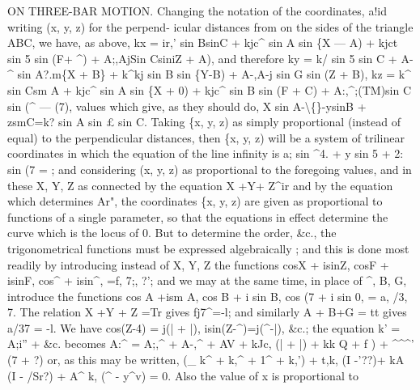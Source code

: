 \documentclass[12pt,a4paper]{article}
\begin{document}
ON THREE-BAR MOTION.
Changing
the
notation
of
the
coordinates,
a!id
writing
(x,
y,
z)
for
the
perpend-
icular distances from
on
the
sides of the
triangle ABC, we have,
as above,
kx = ir,' sin BsinC + kjc\textasciicircum{} sin A sin \{X --- A) + kjct sin 5 sin (F+ \textasciicircum{}) + A;,AjSin CsiniZ + A),
and therefore
ky = k/ sin 5 sin C + A-\textasciicircum{} sin A?.m\{X + B\} + k\textasciicircum{}kj sin B sin \{Y-B) + A-,A-j sin G sin (Z + B),
kz = k\textasciicircum{} sin Csm A + kjc\textasciicircum{} sin A sin \{X + 0) + kjc\textasciicircum{} sin B sin (F + C) + A:,\textasciicircum{};(TM)sin C sin (\textasciicircum{} --- (7),
values which
give,
as they should
do,
X sin A-\textbackslash\{\}-ysinB + zsmC=k? sin A sin \pounds{} sin C.
Taking
\{x,
y,
z)
as
simply
proportional
(instead
of
equal)
to
the
perpendicular
distances, then
\{x,
y,
z)
will
be
a
system
of
trilinear coordinates
in which the equation
of the
line
infinity
is
a; sin \textasciicircum{}4. + y sin 5 +
2: sin (7 =
;
and
considering
(x,
y,
z) as
proportional
to
the foregoing
values, and
in
these X,
Y, Z
as
connected by the
equation X +Y+ Z\textasciicircum{}ir and by the
equation which
determines
Ar",
the
coordinates
\{x,
y, z) are
given
as
proportional
to
functions
of a
single
parameter,
so that the equations
in
effect determine the curve which
is the
locus of 0.
But
to
determine
the
order,
\&c.,
the
trigonometrical
functions
must
be
expressed
algebraically
;
and
this
is
done
most
readily
by
introducing
instead
of X,
Y, Z
the
functions
cosX + isinZ,
cosF + isinF,
cos\textasciicircum{} + isin\textasciicircum{},
=f,
7;,
?';
and we may at the same
time,
in
place of \textasciicircum{}, B,
G, introduce the functions
cos A +ism A,
cos B + i sin B,
cos (7 + i sin 0, = a,
/3,
7.
The
relation X +Y + Z =Tr
gives
fj7\textasciicircum{}=-l;
and
similarly A + B+G = tt
gives
a/37 = -l.
We have
cos(Z-4) = j(| + |),
isin(Z-\textasciicircum{})=j(\textasciicircum{}-|), \&c.;
the equation
k' = A;i'' + \&c. becomes
A:\textasciicircum{} = A;,\textasciicircum{} + A-,\textasciicircum{} + AV + kJc, (| + |) + kk Q + f
) + \textasciicircum{}\textasciicircum{}\textasciicircum{}' (7 + ?)
or, as this may be
written,
(\_ k\textasciicircum{} + k,\textasciicircum{} + 1\textasciicircum{} + k,') + t,k, (I -\guillemotleft{}'??)+ kA
(I - /Sr?) + A\textasciicircum{} k, (\textasciicircum{} - y\textasciicircum{}v) = 0.
Also the value of x
is proportional
to
\end{document}
